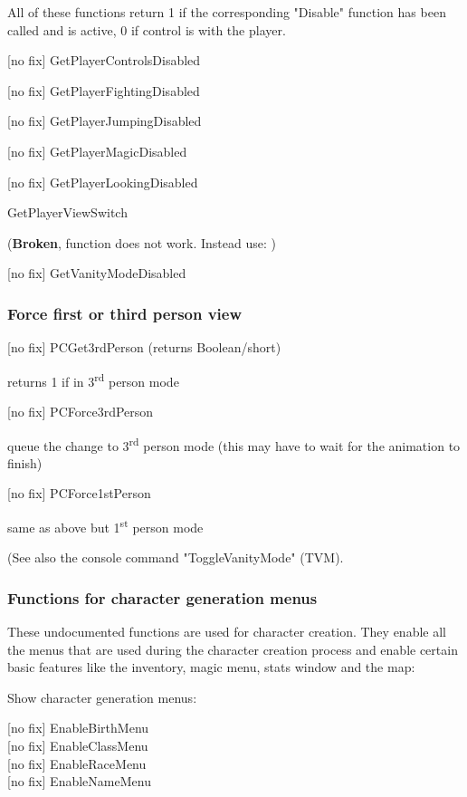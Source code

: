 All of these functions return 1 if the corresponding "Disable" function
has been called and is active, 0 if control is with the player.

{[}no fix{]} GetPlayerControlsDisabled

{[}no fix{]} GetPlayerFightingDisabled

{[}no fix{]} GetPlayerJumpingDisabled

{[}no fix{]} GetPlayerMagicDisabled

{[}no fix{]} GetPlayerLookingDisabled

GetPlayerViewSwitch

(\textbf{Broken}, function does not work. Instead use: )

{[}no fix{]} GetVanityModeDisabled

\hypertarget{force-first-or-third-person-view}{%
\subsubsection{Force first or third person
view}\label{force-first-or-third-person-view}}

{[}no fix{]} PCGet3rdPerson (returns Boolean/short)

returns 1 if in 3\textsuperscript{rd} person mode

{[}no fix{]} PCForce3rdPerson

queue the change to 3\textsuperscript{rd} person mode (this may have to
wait for the animation to finish)

{[}no fix{]} PCForce1stPerson

same as above but 1\textsuperscript{st} person mode

(See also the console command "ToggleVanityMode" (TVM).

\hypertarget{functions-for-character-generation-menus}{%
\subsubsection{Functions for character generation
menus}\label{functions-for-character-generation-menus}}

These undocumented functions are used for character creation. They
enable all the menus that are used during the character creation process
and enable certain basic features like the inventory, magic menu, stats
window and the map:

Show character generation menus:

{[}no fix{]} EnableBirthMenu\\
{[}no fix{]} EnableClassMenu\\
{[}no fix{]} EnableRaceMenu\\
{[}no fix{]} EnableNameMenu

